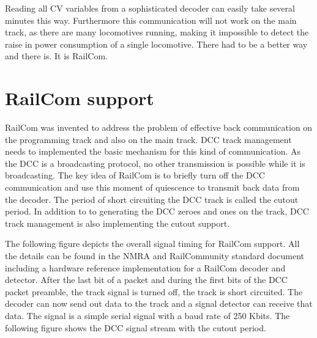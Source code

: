 Reading all CV variables from a sophisticated decoder can easily take several minutes this way. Furthermore this communication will not work on the main track, as there are many locomotives running, making it impossible to detect the raise in power consumption of a single locomotive. There had to be a better way and there is. It is RailCom.

\section{RailCom support}

RailCom was invented to address the problem of effective back communication on the programming track and also on the main track. DCC track management needs to implemented the basic mechanism for this kind of communication. As the DCC is a broadcasting protocol, no other transmission is possible while it is broadcasting. The key idea of RailCom is to briefly turn off the DCC communication and use this moment of quiescence to transmit back data from the decoder. The period of short circuiting the DCC track is called the cutout period. In addition to to generating the DCC zeroes and ones on the track, DCC track management is also implementing the cutout support.

The following figure depicts the overall signal timing for RailCom support. All the details can be found in the NMRA and RailCommunity standard document including a hardware reference implementation for a RailCom decoder and detector. After the last bit of a packet and during the first bits of the DCC packet preamble, the track signal is turned off, the track is short circuited. The decoder can now send out data to the track and a signal detector can receive that data. The signal is a simple serial signal with a baud rate of 250 Kbits. The following figure shows the DCC signal stream with the cutout period.

